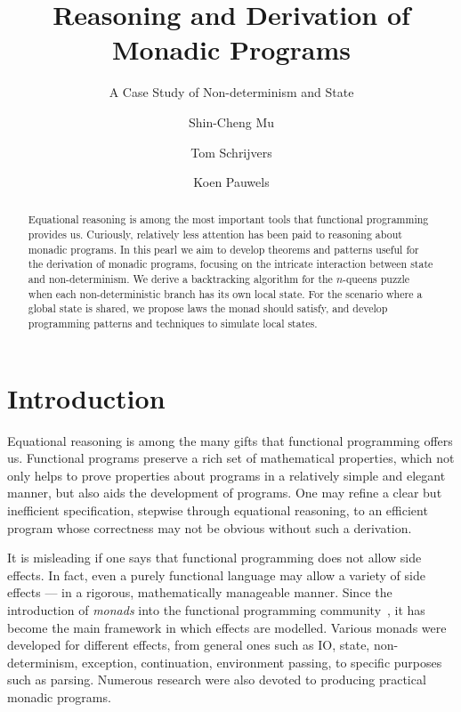 \documentclass{llncs}
\begin{document}
\title{Reasoning and Derivation of Monadic Programs}
\subtitle{A Case Study of Non-determinism and State}

\author{Shin-Cheng Mu  \and Tom Schrijvers  \and Koen Pauwels }

\begin{abstract}
Equational reasoning is among the most important tools that functional programming provides us. Curiously, relatively less attention has been paid to reasoning about monadic programs. In this pearl we aim to develop theorems and patterns useful for the derivation of monadic programs, focusing on the intricate interaction between state and non-determinism. We derive a backtracking algorithm for the $n$-queens puzzle when each non-deterministic branch has its own local state. For the scenario where a global state is shared, we propose laws the monad should satisfy, and develop programming patterns and techniques to simulate local states.
\end{abstract}



\maketitle


\section{Introduction}

Equational reasoning is among the many gifts that functional programming offers us. Functional programs preserve a rich set of mathematical properties, which not only helps to prove properties about programs in a relatively simple and elegant manner, but also aids the development of programs. One may refine a clear but inefficient specification, stepwise through equational reasoning, to an efficient program whose correctness may not be obvious without such a derivation.

It is misleading if one says that functional programming does not allow side effects. In fact, even a purely functional language may allow a variety of side effects --- in a rigorous, mathematically manageable manner. Since the introduction of {\em monads} into the functional programming community~\cite{Moggi:89:Computational,Wadler:92:Monads}, it has become the main framework in which effects are modelled. Various monads were developed for different effects, from general ones such as IO, state, non-determinism, exception, continuation, environment passing, to specific purposes such as parsing. Numerous research were also devoted to producing practical monadic programs.
\end{document}
